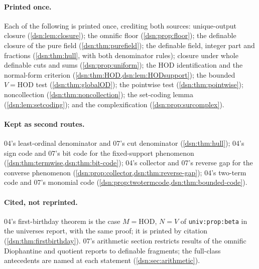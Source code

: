 \documentclass[11pt,a4paper]{article}
\numberwithin{equation}{section}
\theoremstyle{definition}
\theoremstyle{remark}
\newcommand{\HOD}{\mathrm{HOD}}
\newcommand{\lbl}[1]{\nolinkurl{#1}}
\begin{document}
\paragraph{Printed once.} Each of the following is printed once, crediting
both sources: unique-output closure (\cref{dsn:lem:closure}); the omnific
floor (\cref{dsn:prop:floor}); the definable closure of the pure field
(\cref{dsn:thm:purefield}); the definable field, integer part and fractions
(\cref{dsn:thm:hull}, with both denominator rules); closure under whole
definable cuts and sums (\cref{dsn:prop:uniform}); the $\HOD$
identification and the normal-form criterion
(\cref{dsn:thm:HOD,dsn:lem:HODsupport}); the bounded $V=\HOD$ test
(\cref{dsn:thm:globalOD}); the pointwise test (\cref{dsn:thm:pointwise});
noncollection (\cref{dsn:thm:noncollection}); the set-coding lemma
(\cref{dsn:lem:setcoding}); and the complexification
(\cref{dsn:prop:surcomplex}).

\paragraph{Kept as second routes.} 04's least-ordinal denominator and
07's cut denominator (\cref{dsn:thm:hull}); 04's sign code and 07's bit code
for the fixed-support phenomenon (\cref{dsn:thm:termwise,dsn:thm:bit-code});
04's collector and 07's reverse gap for the converse phenomenon
(\cref{dsn:prop:collector,dsn:thm:reverse-gap}); 04's two-term code and
07's monomial code (\cref{dsn:prop:twotermcode,dsn:thm:bounded-code}).

\paragraph{Cited, not reprinted.} 04's first-birthday theorem is the case
$M=\HOD$, $N=V$ of \lbl{univ:prop:beta} in the universes report, with the
same proof; it is printed by citation (\cref{dsn:thm:firstbirthday}).
07's arithmetic section restricts results of the omnific Diophantine and
quotient reports to definable fragments; the full-class antecedents are
named at each statement (\cref{dsn:sec:arithmetic}).
\end{document}

